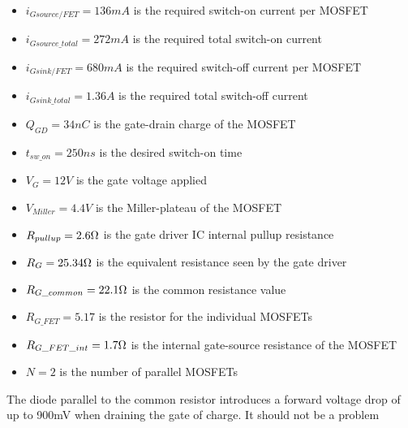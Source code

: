     \begin{itemize}
        \item $i_{Gsource/FET} = 136 mA$ is the required switch-on current per MOSFET
        \item $i_{Gsource{\_}total} = 272 mA$ is the required total switch-on current
        \item $i_{Gsink/FET} = 680 mA$ is the required switch-off current per MOSFET
        \item $i_{Gsink{\_}total} = 1.36 A$ is the required total switch-off current
        \item $Q_{GD} = 34 nC$ is the gate-drain charge of the MOSFET
        \item $t_{sw{\_}on} = 250 ns$ is the desired switch-on time
        \item $V_G = 12V$ is the gate voltage applied
        \item $V_{Miller} = 4.4 V$ is the Miller-plateau of the MOSFET
        \item $R_{pullup} = 2.6 \ohm$ is the gate driver IC internal pullup resistance
        \item $R_G = 25.34 \ohm$ is the equivalent resistance seen by the gate driver
        \item $R_{G{\_}common} = 22.1 \ohm$ is the common resistance value
        \item $R_{G{\_}FET} = 5.17$ is the resistor for the individual MOSFETs
        \item $R_{G{\_}FET{\_}int} = 1.7 \ohm$ is the internal gate-source resistance of the MOSFET
        \item $N = 2$ is the number of parallel MOSFETs
    \end{itemize}
    
    The diode parallel to the common resistor introduces a forward voltage drop of up to 900mV when draining the gate of charge. It should not be a problem